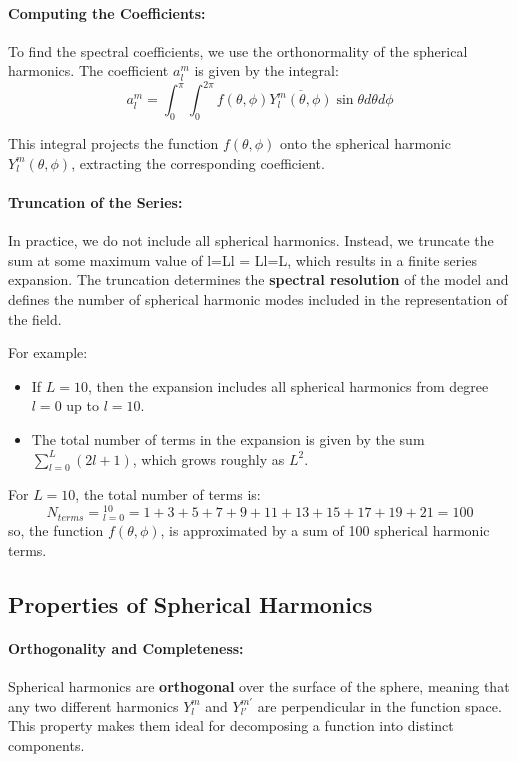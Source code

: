 \paragraph{\textbf{Computing the Coefficients}:}

To find the spectral coefficients, we use the orthonormality of the spherical harmonics. The coefficient $a_l^m$ is given by the integral:
\[
	a_l^m=\int_0^\pi\int_0^{2\pi}f(\theta,\phi)\overline{Y_l^m(\theta,\phi)}\sin\theta d\theta d\phi
\]

This integral projects the function $f(\theta,\phi)$ onto the spherical harmonic $Y_l^m(\theta,\phi)$, extracting the corresponding coefficient.

\paragraph{\textbf{Truncation of the Series}:}

In practice, we do not include all spherical harmonics. Instead, we truncate the sum at some maximum value of l=Ll = Ll=L, which results in a finite series expansion. The truncation determines the \textbf{spectral resolution} of the model and defines the number of spherical harmonic modes included in the representation of the field.

For example:

\begin{itemize}
	\item If $L=10$, then the expansion includes all spherical harmonics from degree $l=0$ up to $l=10$.
	\item The total number of terms in the expansion is given by the sum $\displaystyle\sum_{l=0}^L(2l+1)$, which grows roughly as $L^2$.
\end{itemize}
For $L=10$, the total number of terms is:
\[
	N_{terms}=\displaystyle_{l=0}^{10}=1+3+5+7+9+11+13+15+17+19+21=100
\]
so, the function $f(\theta,\phi)$, is approximated by a sum of 100 spherical harmonic terms.

\subsection{Properties of Spherical Harmonics}

\paragraph{\textbf{Orthogonality and Completeness}:}

Spherical harmonics are \textbf{orthogonal} over the surface of the sphere, meaning that any two different harmonics $Y_l^m$ and $Y_{l'}^{m'}$ are perpendicular in the function space. This property makes them ideal for decomposing a function into distinct components.

